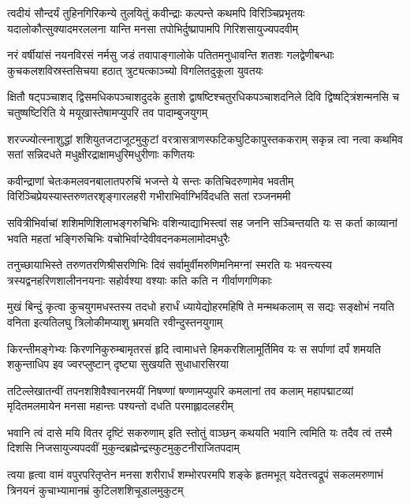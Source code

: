 \fourlineindentedshloka
{त्वदीयं सौन्दर्यं तुहिनगिरिकन्ये तुलयितुं}
{कवीन्द्राः कल्पन्ते कथमपि विरिञ्चिप्रभृतयः}
{यदालोकौत्सुक्यादमरललना यान्ति मनसा}
{तपोभिर्दुष्प्रापामपि गिरिशसायुज्यपदवीम्}%

\fourlineindentedshloka
{नरं वर्षीयांसं नयनविरसं नर्मसु जडं}
{तवापाङ्गालोके पतितमनुधावन्ति शतशः}
{गलद्वेणीबन्धाः कुचकलशविस्रस्तसिचया}
{हठात् त्रुट्यत्काञ्च्यो विगलितदुकूला युवतयः}%

\fourlineindentedshloka
{क्षितौ षट्पञ्चाशद् द्विसमधिकपञ्चाशदुदके}
{हुताशे द्वाषष्टिश्चतुरधिकपञ्चाशदनिले}
{दिवि द्विष्षट्त्रिंशन्मनसि च चतुष्षष्टिरिति ये}
{मयूखास्तेषामप्युपरि तव पादाम्बुजयुगम्}%

\fourlineindentedshloka
{शरज्ज्योत्स्नाशुद्धां शशियुतजटाजूटमुकुटां}
{वरत्रासत्राणस्फटिकघुटिकापुस्तककराम्}
{सकृन्न त्वा नत्वा कथमिव सतां सन्निदधते}
{मधुक्षीरद्राक्षामधुरिमधुरीणाः कणितयः}%

\fourlineindentedshloka
{कवीन्द्राणां चेतःकमलवनबालातपरुचिं}
{भजन्ते ये सन्तः कतिचिदरुणामेव भवतीम्}
{विरिञ्चिप्रेयस्यास्तरुणतरशृङ्गारलहरी}
{गभीराभिर्वाग्भिर्विदधति सतां रञ्जनममी}%

\fourlineindentedshloka
{सवित्रीभिर्वाचां शशिमणिशिलाभङ्गरुचिभिः}
{वशिन्याद्याभिस्त्वां सह जननि सञ्चिन्तयति यः}
{स कर्ता काव्यानां भवति महतां भङ्गिरुचिभिः}
{वचोभिर्वाग्देवीवदनकमलामोदमधुरैः}%

\fourlineindentedshloka
{तनुच्छायाभिस्ते तरुणतरणिश्रीसरणिभिः}
{दिवं सर्वामुर्वीमरुणिमनिमग्नां स्मरति यः}
{भवन्त्यस्य त्रस्यद्वनहरिणशालीननयनाः}
{सहोर्वश्या वश्याः कति कति न गीर्वाणगणिकाः}%

\fourlineindentedshloka
{मुखं बिन्दुं कृत्वा कुचयुगमधस्तस्य तदधो}
{हरार्धं ध्यायेद्योहरमहिषि ते मन्मथकलाम्}
{स सद्यः सङ्क्षोभं नयति वनिता इत्यतिलघु}
{त्रिलोकीमप्याशु भ्रमयति रवीन्दुस्तनयुगाम्}%

\fourlineindentedshloka
{किरन्तीमङ्गेभ्यः किरणनिकुरुम्बामृतरसं}
{हृदि त्वामाधत्ते हिमकरशिलामूर्तिमिव यः}
{स सर्पाणां दर्पं शमयति शकुन्ताधिप इव}
{ज्वरप्लुष्टान् दृष्ट्या सुखयति सुधाधारसिरया}%

\fourlineindentedshloka
{तटिल्लेखातन्वीं तपनशशिवैश्वानरमयीं}
{निषण्णां षण्णामप्युपरि कमलानां तव कलाम्}
{महापद्माटव्यां मृदितमलमायेन मनसा}
{महान्तः पश्यन्तो दधति परमाह्लादलहरीम्}%

\fourlineindentedshloka
{भवानि त्वं दासे मयि वितर दृष्टिं सकरुणाम्}
{इति स्तोतुं वाञ्छन् कथयति भवानि त्वमिति यः}
{तदैव त्वं तस्मै दिशसि निजसायुज्यपदवीं}
{मुकुन्दब्रह्मेन्द्रस्फुटमुकुटनीराजितपदाम्}%

\fourlineindentedshloka
{त्वया हृत्वा वामं वपुरपरितृप्तेन मनसा}
{शरीरार्धं शम्भोरपरमपि शङ्के हृतमभूत्}
{यदेतत्त्वद्रूपं सकलमरुणाभं त्रिनयनं}
{कुचाभ्यामानम्रं कुटिलशशिचूडालमुकुटम्}%

